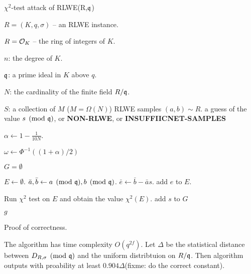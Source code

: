 \documentclass{amsart}
\begin{document}
\begin{algorithm}[H]
\caption{$\chi^2$-test attack of RLWE(R,$\mathfrak{q}$)}          %
\label{IPR}                           %
\begin{algorithmic}[1]              %
     \Require

     $R = (K,q,\sigma)$ -- an RLWE instance.

     $R = \mathcal{O}_K$ -- the ring of integers of $K$.

     $n$: the degree of $K$.

     $\mathfrak{q}$: a prime ideal in $K$ above $q$.

     $N$: the cardinality of the finite field $R/\mathfrak{q}$.

     $S$: a collection of $M$ ($M = \Omega(N)$) RLWE samples $(a,b) \sim R$.  %
    \Ensure a guess of the value $s \pmod{\mathfrak{q}}$, or {\bf NON-RLWE}, or {\bf INSUFFIICNET-SAMPLES}


    \State $\alpha \gets 1 - \frac{1}{10N}$.

    \State $\omega \gets \Phi^{-1}((1+\alpha)/2)$

    \State $G = \emptyset$

            \State $E \gets \emptyset$.
            \State $\bar{a}, \bar{b} \gets a \pmod{\mathfrak{q}}, b \pmod{\mathfrak{q}}$.
            \State $\bar{e} \gets \bar{b} - \bar{a}s$.
            \State add $e$ to $E$.
        \EndFor

        \State Run $\chi^2$ test on $E$ and obtain the value $\chi^2(E)$.
            \State add $s$ to $G$
        \EndIf
    \EndFor


        \Return $g$
    \Else

    \EndIf

\end{algorithmic}
\end{algorithm}


Proof of correctness.
\begin{Prop}
The algorithm has time complexity $O(q^{2f})$. Let $\Delta$ be the statistical distance between $D_{R, \sigma} \pmod{\mathfrak{q}}$ and the uniform distribtuion on $R/\mathfrak{q}$. Then algorithm outputs with proability at least $0.904 \Delta$(fixme: do the correct constant).
\end{Prop}
\end{document}
